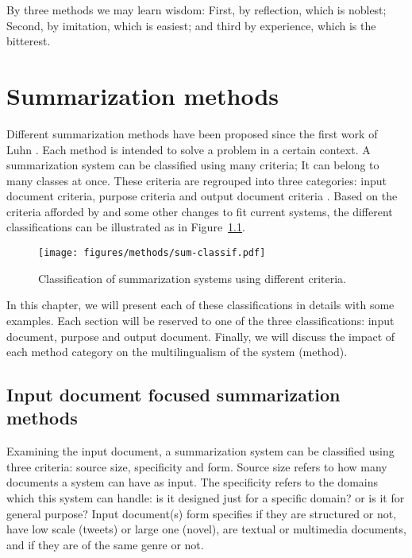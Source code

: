 \begin{savequote}[75mm] 
By three methods we may learn wisdom: First, by reflection, which is noblest; Second, by imitation, which is easiest; and third by experience, which is the bitterest.
\end{savequote}

\chapter{Summarization methods}
\label{chap:summeth}


Different summarization methods have been proposed since the first work of Luhn \citep{58-luhn}. 
Each method is intended to solve a problem in a certain context. 
A summarization system can be classified using many criteria; It can belong to many classes at once. 
These criteria are regrouped into three categories: input document criteria, purpose criteria and output document criteria \citep{98-hovy-lin,99-sparckjones}. 
Based on the criteria afforded by \citet{98-hovy-lin} and some other changes to fit current systems, the different classifications can be illustrated as in Figure~\ref{fig:summary-classif}.

\begin{figure}[ht]
	\begin{center}
		\texttt{[image: figures/methods/sum-classif.pdf]} %
		\caption{Classification of summarization systems using different criteria.}
		\label{fig:summary-classif}
	\end{center}
\end{figure}

In this chapter, we will present each of these classifications in details with some examples. 
Each section will be reserved to one of the three classifications: input document, purpose and output document. 
Finally, we will discuss the impact of each method category on the multilingualism of the system (method).


\section{Input document focused summarization methods}

Examining the input document, a summarization system can be classified using three criteria: source size, specificity and form. 
Source size refers to how many documents a system can have as input. 
The specificity refers to the domains which this system can handle: is it designed just for a specific domain? or is it for general purpose? 
Input document(s) form specifies if they are structured or not, have low scale (tweets) or large one (novel), are textual or multimedia documents, and if they are of the same genre or not. 

